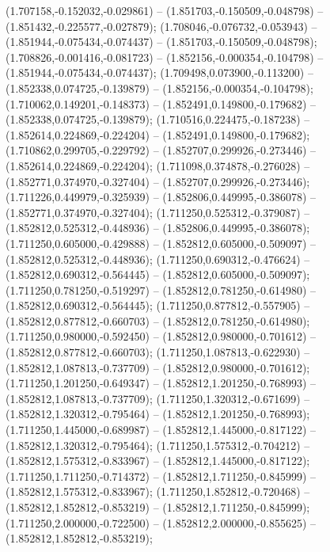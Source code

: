  (1.707158,-0.152032,-0.029861) -- (1.851703,-0.150509,-0.048798) -- (1.851432,-0.225577,-0.027879);
 (1.708046,-0.076732,-0.053943) -- (1.851944,-0.075434,-0.074437) -- (1.851703,-0.150509,-0.048798);
 (1.708826,-0.001416,-0.081723) -- (1.852156,-0.000354,-0.104798) -- (1.851944,-0.075434,-0.074437);
 (1.709498,0.073900,-0.113200) -- (1.852338,0.074725,-0.139879) -- (1.852156,-0.000354,-0.104798);
 (1.710062,0.149201,-0.148373) -- (1.852491,0.149800,-0.179682) -- (1.852338,0.074725,-0.139879);
 (1.710516,0.224475,-0.187238) -- (1.852614,0.224869,-0.224204) -- (1.852491,0.149800,-0.179682);
 (1.710862,0.299705,-0.229792) -- (1.852707,0.299926,-0.273446) -- (1.852614,0.224869,-0.224204);
 (1.711098,0.374878,-0.276028) -- (1.852771,0.374970,-0.327404) -- (1.852707,0.299926,-0.273446);
 (1.711226,0.449979,-0.325939) -- (1.852806,0.449995,-0.386078) -- (1.852771,0.374970,-0.327404);
 (1.711250,0.525312,-0.379087) -- (1.852812,0.525312,-0.448936) -- (1.852806,0.449995,-0.386078);
 (1.711250,0.605000,-0.429888) -- (1.852812,0.605000,-0.509097) -- (1.852812,0.525312,-0.448936);
 (1.711250,0.690312,-0.476624) -- (1.852812,0.690312,-0.564445) -- (1.852812,0.605000,-0.509097);
 (1.711250,0.781250,-0.519297) -- (1.852812,0.781250,-0.614980) -- (1.852812,0.690312,-0.564445);
 (1.711250,0.877812,-0.557905) -- (1.852812,0.877812,-0.660703) -- (1.852812,0.781250,-0.614980);
 (1.711250,0.980000,-0.592450) -- (1.852812,0.980000,-0.701612) -- (1.852812,0.877812,-0.660703);
 (1.711250,1.087813,-0.622930) -- (1.852812,1.087813,-0.737709) -- (1.852812,0.980000,-0.701612);
 (1.711250,1.201250,-0.649347) -- (1.852812,1.201250,-0.768993) -- (1.852812,1.087813,-0.737709);
 (1.711250,1.320312,-0.671699) -- (1.852812,1.320312,-0.795464) -- (1.852812,1.201250,-0.768993);
 (1.711250,1.445000,-0.689987) -- (1.852812,1.445000,-0.817122) -- (1.852812,1.320312,-0.795464);
 (1.711250,1.575312,-0.704212) -- (1.852812,1.575312,-0.833967) -- (1.852812,1.445000,-0.817122);
 (1.711250,1.711250,-0.714372) -- (1.852812,1.711250,-0.845999) -- (1.852812,1.575312,-0.833967);
 (1.711250,1.852812,-0.720468) -- (1.852812,1.852812,-0.853219) -- (1.852812,1.711250,-0.845999);
 (1.711250,2.000000,-0.722500) -- (1.852812,2.000000,-0.855625) -- (1.852812,1.852812,-0.853219);
